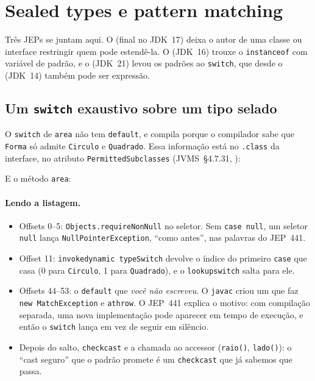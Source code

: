 \section{Sealed types e pattern matching}
\label{sec:sealed-pattern}

Três JEPs se juntam aqui. O  (final no JDK~17)
deixa o autor de uma classe ou interface restringir quem pode
estendê-la. O  (JDK~16) trouxe o
\texttt{instanceof} com variável de padrão, e o 
(JDK~21) levou os padrões ao \texttt{switch}, que desde o
 (JDK~14) também pode ser expressão.

\subsection*{Um \texttt{switch} exaustivo sobre um tipo selado}



O \texttt{switch} de \texttt{area} não tem \texttt{default}, e compila
porque o compilador sabe que \texttt{Forma} só admite \texttt{Circulo} e
\texttt{Quadrado}. Essa informação está no \texttt{.class} da interface,
no atributo \texttt{PermittedSubclasses} (JVMS~§4.7.31,
):


E o método \texttt{area}:


\paragraph{Lendo a listagem.}
\begin{itemize}
\item Offsets 0--5: \texttt{Objects.requireNonNull} no seletor. Sem
  \texttt{case null}, um seletor \texttt{null} lança
  \texttt{NullPointerException}, \enquote{como antes}, nas palavras do
  JEP~441.
\item Offset 11: \texttt{invokedynamic typeSwitch} devolve o índice do
  primeiro \texttt{case} que casa (0 para \texttt{Circulo}, 1 para
  \texttt{Quadrado}), e o \texttt{lookupswitch} salta para ele.
\item Offsets 44--53: o \texttt{default} que \emph{você não escreveu}.
  O \texttt{javac} criou um que faz \texttt{new MatchException} e
  \texttt{athrow}. O JEP~441 explica o motivo: com compilação separada,
  uma nova implementação pode aparecer em tempo de execução, e então o
  \texttt{switch} lança em vez de seguir em silêncio.
\item Depois do salto, \texttt{checkcast} e a chamada ao accessor
  (\texttt{raio()}, \texttt{lado()}): o \enquote{cast seguro} que o padrão
  promete é um \texttt{checkcast} que já sabemos que passa.
\end{itemize}

